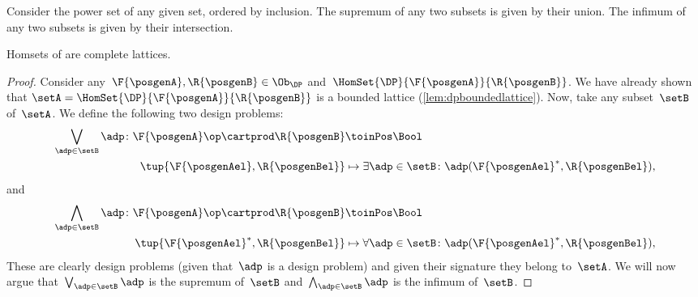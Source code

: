 \begin{example}
    Consider the power set of any given set, ordered by inclusion.
    The supremum of any two subsets is given by their union.
    The infimum of any two subsets is given by their intersection.
\end{example}


\begin{lemma}
    \label{lem:DP-homsets-complete-lattice}
    Homsets of \DP are complete lattices.
\end{lemma}

\begin{proof}
    Consider any~$\F{\posgenA},\R{\posgenB}\in \Ob_\DP$ and~$\HomSet{\DP}{\F{\posgenA}}{\R{\posgenB}}$.
    We have already shown that $\setA=\HomSet{\DP}{\F{\posgenA}}{\R{\posgenB}}$ is a bounded lattice (\cref{lem:dpboundedlattice}).
    Now, take any subset~$\setB$ of~$\setA$.
    We define the following two design problems:
    \begin{equation*}
        \begin{aligned}
            \bigvee_{\adp \in \setB} \adp\colon \F{\posgenA}\op \cartprod \R{\posgenB}&\toinPos \Bool\\
            \tup{\F{\posgenAel},\R{\posgenBel}}&\mapsto \exists \adp\in \setB\colon \adp(\F{\posgenAel}^*,\R{\posgenBel}),
        \end{aligned}
    \end{equation*}
    and
    \begin{equation*}
        \begin{aligned}
            \bigwedge_{\adp \in \setB} \adp\colon \F{\posgenA}\op \cartprod \R{\posgenB}&\toinPos \Bool\\
            \tup{\F{\posgenAel}^*,\R{\posgenBel}}&\mapsto \forall \adp\in \setB\colon \adp(\F{\posgenAel}^*,\R{\posgenBel}),
        \end{aligned}
    \end{equation*}
    These are clearly design problems (given that~$\adp$ is a design problem) and given their signature they belong to~$\setA$.
    We will now argue that~$\bigvee_{\adp \in \setB} \adp$ is the supremum of~$\setB$ and~$\bigwedge_{\adp \in \setB} \adp$ is the infimum of~$\setB$.

\end{proof}
